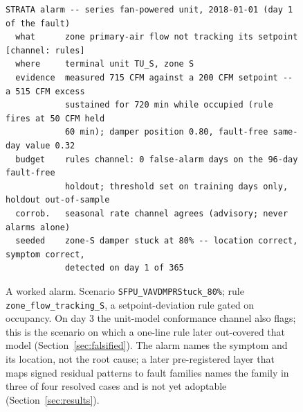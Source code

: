 \documentclass[11pt,letterpaper]{article}
\begin{document}
\begin{figure}[t]
\small
\begin{verbatim}
STRATA alarm -- series fan-powered unit, 2018-01-01 (day 1 of the fault)
  what      zone primary-air flow not tracking its setpoint   [channel: rules]
  where     terminal unit TU_S, zone S
  evidence  measured 715 CFM against a 200 CFM setpoint -- a 515 CFM excess
            sustained for 720 min while occupied (rule fires at 50 CFM held
            60 min); damper position 0.80, fault-free same-day value 0.32
  budget    rules channel: 0 false-alarm days on the 96-day fault-free
            holdout; threshold set on training days only, holdout out-of-sample
  corrob.   seasonal rate channel agrees (advisory; never alarms alone)
  seeded    zone-S damper stuck at 80% -- location correct, symptom correct,
            detected on day 1 of 365
\end{verbatim}
\caption{A worked alarm. Scenario \texttt{SFPU\_VAVDMPRStuck\_80\%}; rule \texttt{zone\_flow\_tracking\_S}, a setpoint-deviation rule gated on occupancy. On day 3 the unit-model conformance channel also flags; this is the scenario on which a one-line rule later out-covered that model (Section~\ref{sec:falsified}). The alarm names the symptom and its location, not the root cause; a later pre-registered layer that maps signed residual patterns to fault families names the family in three of four resolved cases and is not yet adoptable (Section~\ref{sec:results}).}
\label{lst:alarm}
\end{figure}
\end{document}
